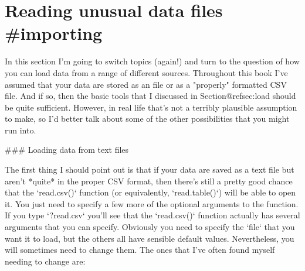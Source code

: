 \section{Reading unusual data files {#importing}}

In this section I'm going to switch topics (again!) and turn to the question of how you can load data from a range of different sources. Throughout this book I've assumed that your data are stored as an  file or as a "properly" formatted CSV file. And if so, then the basic tools that I discussed in Section@refsec:load should be quite sufficient. However, in real life that's not a terribly plausible assumption to make, so I'd better talk about some of the other possibilities that you might run into. 


### Loading data from text files 

The first thing I should point out is that if your data are saved as a text file but aren't *quite* in the proper CSV format, then there's still a pretty good chance that the `read.csv()` function (or equivalently, `read.table()`) will be able to open it. You just need to specify a few more of the optional arguments to the function. If you type `?read.csv` you'll see that the `read.csv()` function actually has several arguments that you can specify. Obviously you need to specify the `file` that you want it to load, but the others all have sensible default values. Nevertheless, you will sometimes need to change them. The ones that I've often found myself needing to change are:

